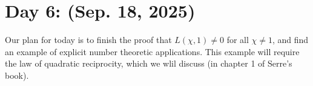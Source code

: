 \section{Day 6: (Sep. 18, 2025)}
Our plan for today is to finish the proof that $L(\chi, 1) \neq 0$ for all $\chi \neq 1$, and find an example of explicit number theoretic applications. This example will require the law of quadratic reciprocity, which we wlil discuss (in chapter 1 of Serre's book).
\\[8pt]
